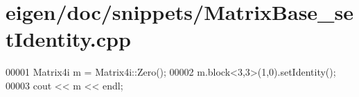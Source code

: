 \hypertarget{eigen_2doc_2snippets_2_matrix_base__set_identity_8cpp_source}{}\section{eigen/doc/snippets/\+Matrix\+Base\+\_\+set\+Identity.cpp}
\label{eigen_2doc_2snippets_2_matrix_base__set_identity_8cpp_source}

\begin{DoxyCode}
00001 Matrix4i m = Matrix4i::Zero();
00002 m.block<3,3>(1,0).setIdentity();
00003 cout << m << endl;
\end{DoxyCode}
